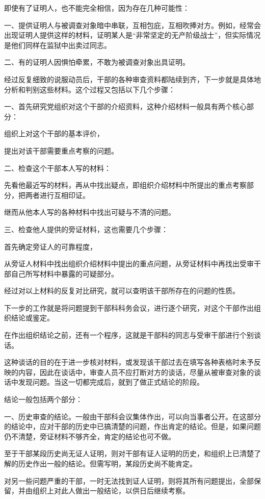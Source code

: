 即使有了证明人，也不能完全相信，因为存在几种可能性：

一、提供证明人与被调查对象暗中串联，互相包庇，互相吹捧对方。例如，经常会出现证明人提供这样的材料，证明某人是“非常坚定的无产阶级战士”，但实际情况是他们同样在监狱中出卖过同志。

二、有的证明人因惧怕牵累，不敢为被调查对象出具证明。

经过反复细致的说服动员后，干部的各种审查资料都陆续到齐，下一步就是具体地分析和判别这些材料。这个过程又包括以下几个步骤：

一、首先研究党组织对这个干部的介绍资料，这种介绍材料一般具有两个核心部分：

组织上对这个干部的基本评价，

提出对该干部需要重点考察的问题。

二、检查这个干部本人写的材料：

先看他最近写的材料，再从中找出疑点，即组织介绍材料中所提出的重点考察部分，把两者进行互相印证。

继而从他本人写的各种材料中找出可疑与不清的问题。

三、检查他人提供的旁证材料，这也需要几个步骤：

首先确定旁证人的可靠程度，

从旁证人材料中找出组织介绍材料中提出的重点问题，从旁证材料中再找出受审干部自己所写材料中暴露的可疑部分。

经过对以上材料的反复对比研究，就可以查明该干部所存在的问题的性质。

下一步的工作就是将问题提到干部科科务会议，进行逐个研究，对这个干部作出组织结论或鉴定。

在作出组织结论之前，还有一个程序，这就是干部科的同志与受审干部进行个别谈话。

这种谈话的目的在于进一步核对材料，或发现该干部过去在填写各种表格时未予反映的内容，因此在谈话中，审查人员不应打断对方的谈话，尽量从被审查对象的谈话中发现问题。当这一切都完成后，就到了做正式结论的阶段。

结论一般包括两个部分：

一、历史审查的结论。一般由干部科会议集体作出，可以向当事者公开。在这部分的结论中，应对干部的历史中已搞清楚的问题，作出肯定的结论。但是，如果问题仍不清楚，旁证材料不够齐全，肯定的结论也可不做。

至于干部某段历史尚无证人证明，则对干部有证人证明的历史，和组织上已清楚了解的历史作出一般的结论。但需写明，某段历史尚不能肯定。

对另一些问题严重的干部，一时无法找到证人证明，则将其所有问题提出，全部保留，并由组织上对此人做出一般结论，以供日后继续考察。

